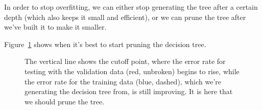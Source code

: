 In order to stop overfitting, we can either stop generating the tree after a
certain depth (which also keeps it small and efficient), or we can prune the
tree after we've built it to make it smaller.

Figure~\ref{fig:overfitting} shows when it's best to start pruning the decision
tree.

\begin{figure}[!h]
  \centering
  \caption{The vertical line shows the cutoff point, where the error rate for
  testing with the validation data (red, unbroken) begins to rise, while the
  error rate for the training data (blue, dashed), which we're generating the
  decision tree from, is still improving. It is here that we should prune the
  tree.}
  \label{fig:overfitting}
\end{figure}